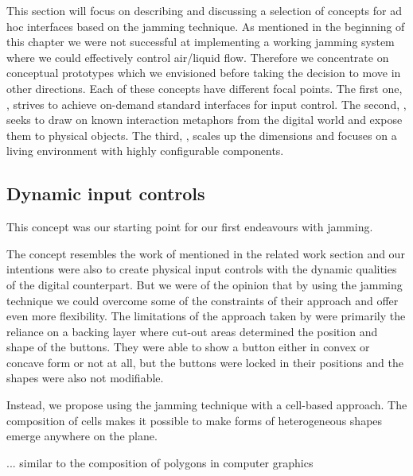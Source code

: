This section will focus on describing and discussing a selection of concepts for ad hoc interfaces based on the jamming technique.
As mentioned in the beginning of this chapter we were not successful at implementing a working jamming system where we could effectively control air/liquid flow.
Therefore we concentrate on conceptual prototypes which we envisioned before taking the decision to move in other directions.
Each of these concepts have different focal points.
The first one, \emph{}, strives to achieve on-demand standard interfaces for input control.
The second, \emph{}, seeks to draw on known interaction metaphors from the digital world and expose them to physical objects.
The third, \emph{}, scales up the dimensions and focuses on a living environment with highly configurable components.

\subsection{Dynamic input controls} 
\label{ch:jamming:concepts:dynamic_input}

This concept was our starting point for our first endeavours with jamming.

The concept resembles the work of \citet{harrison2009providing} mentioned in the related work section and our intentions were also to create physical input controls with the dynamic qualities of the digital counterpart.
But we were of the opinion that by using the jamming technique we could overcome some of the constraints of their approach and offer even more flexibility.
The limitations of the approach taken by \citet{harrison2009providing} were primarily the reliance on a backing layer where cut-out areas determined the position and shape of the buttons.
They were able to show a button either in convex or concave form or not at all, but the buttons were locked in their positions and the shapes were also not modifiable.

Instead, we propose using the jamming technique with a cell-based approach.
The composition of cells makes it possible to make forms of heterogeneous shapes emerge anywhere on the plane.

... similar to the composition of polygons in computer graphics




\\

